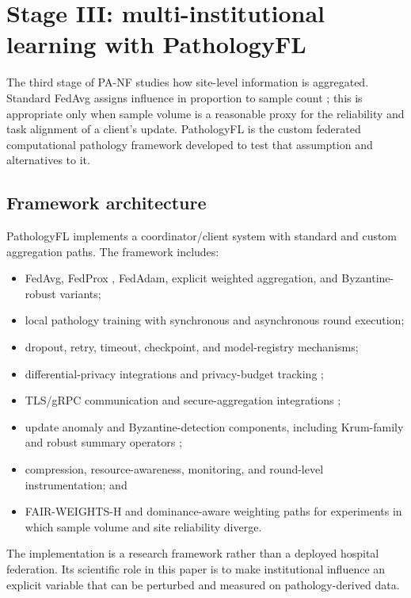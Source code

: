 \section{Stage III: multi-institutional learning with PathologyFL}


The third stage of PA-NF studies how site-level information is aggregated. Standard FedAvg assigns influence in proportion to sample count \cite{mcmahan2017fedavg}; this is appropriate only when sample volume is a reasonable proxy for the reliability and task alignment of a client's update. PathologyFL is the custom federated computational pathology framework developed to test that assumption and alternatives to it.

\subsection{Framework architecture}
PathologyFL implements a coordinator/client system with standard and custom aggregation paths. The framework includes:
\begin{itemize}
\item FedAvg, FedProx \cite{li2020fedprox}, FedAdam, explicit weighted aggregation, and Byzantine-robust variants;
\item local pathology training with synchronous and asynchronous round execution;
\item dropout, retry, timeout, checkpoint, and model-registry mechanisms;
\item differential-privacy integrations and privacy-budget tracking \cite{abadi2016dp};
\item TLS/gRPC communication and secure-aggregation integrations \cite{bonawitz2017secure};
\item update anomaly and Byzantine-detection components, including Krum-family and robust summary operators \cite{blanchard2017krum};
\item compression, resource-awareness, monitoring, and round-level instrumentation; and
\item FAIR-WEIGHTS-H and dominance-aware weighting paths for experiments in which sample volume and site reliability diverge.
\end{itemize}

The implementation is a research framework rather than a deployed hospital federation. Its scientific role in this paper is to make institutional influence an explicit variable that can be perturbed and measured on pathology-derived data.

